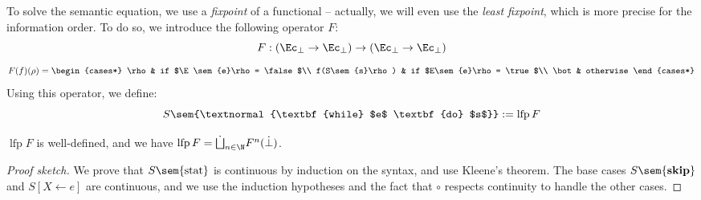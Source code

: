 \documentclass[toc, titlepaged]{../cs-classes/cs-classes}
\DeclareMathOperator{\lfp}{lfp}
\begin{document}
To solve the semantic equation, we use a \emph{fixpoint} of a functional -- actually, we will even use the \emph{least fixpoint}, which is more precise for the information order. To do so, we introduce the following operator $F$:
\begin{equation*}
    F : (\Ec_\bot \to \Ec_\bot) \to (\Ec_\bot\to\Ec_\bot)
\end{equation*}
\begin{equation*}
    F(f)(\rho) = \begin{cases*}
        \rho & if $\E\sem{e}\rho = \false$\\
        f(S\sem{s}\rho) & if $E\sem{e}\rho = \true$\\
        \bot & otherwise
    \end{cases*}
\end{equation*}
Using this operator, we define:
\begin{equation*}
    S\sem{\textnormal{\textbf{while} $e$ \textbf{do} $s$}} := \lfp F
\end{equation*}

\begin{theorem}
    $\lfp F$ is well-defined, and we have $\lfp F=\dot{\bigsqcup}_{n\in\N}F^n(\dot{\bot})$.
\end{theorem}
\begin{proof}[Proof sketch]
    We prove that $S\sem{\textnormal{stat}}$ is continuous by induction on the syntax, and use Kleene's theorem. The base cases $S\sem{\textbf{skip}}$ and $S[X\leftarrow e]$ are continuous, and we use the induction hypotheses and the fact that $\circ$ respects continuity to handle the other cases.
\end{proof}
\end{document}
